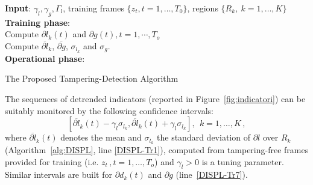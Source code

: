 \documentclass{llncs}
\begin{document}
\begin{algorithm}[t]
	\LinesNumbered
	\textbf{Input}: $\gamma_l, \gamma_g, \Gamma_l$, training frames $\{z_t, t = 1, \dots, T_{0}\}$, regions $\{R_k, \ k=1,\dots,K\}$ \\
	\textbf{Training phase}:\\
	 Compute $\partial l_k(t)$ and $\partial g(t), t = 1, \cdots, T_o$\\ 
	 Compute $\overline{\partial l}_k$, $\overline{\partial g}$, $\sigma_{l_k}$ and $\sigma_{g}$.\\
	
	\textbf{Operational phase}:\\
	    
	\caption{The Proposed Tampering-Detection Algorithm}
	\label{alg:DISPL}
\end{algorithm}

The sequences of detrended indicators (reported in Figure~\ref{fig:indicatori}) can be suitably monitored by the following confidence intervals:
\begin{equation}\label{eq:confidenceRegions}
 [\overline{\partial l}_k(t) - \gamma_l \sigma_{l_k}, \overline{\partial l}_k(t) + \gamma_l \sigma_{l_k}], \ \  k = 1,\dots,K\,,
\end{equation}
where $\overline{\partial l}_k(t)$ denotes the mean and $\sigma_{l_k}$ the standard deviation of $\partial l$ over $R_k$ (Algorithm~\ref{alg:DISPL}, line \ref{DISPL-Tr1}), computed from tampering-free frames provided for training (i.e. $z_t\,, t = 1, \dots, T_o$) and $\gamma_l >0$ is a tuning parameter. Similar intervals are built for  $\partial d_k(t)$ and $\partial g$ (line~\ref{DISPL-Tr7}). 
\end{document}
